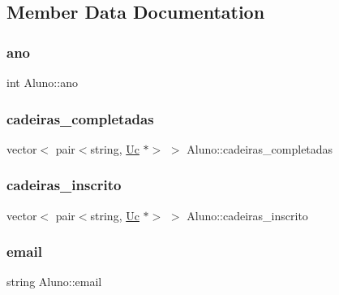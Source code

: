 \subsection{Member Data Documentation}
\hypertarget{class_aluno_abcf2d0bb0b690d81e01e9b38f68897c6}{}\label{class_aluno_abcf2d0bb0b690d81e01e9b38f68897c6} 
\subsubsection{\texorpdfstring{ano}{ano}}
{\footnotesize\ttfamily int Aluno\+::ano\hspace{0.3cm}{\ttfamily [private]}}

\hypertarget{class_aluno_aa9de55282ab2d53a6e903999db67eefc}{}\label{class_aluno_aa9de55282ab2d53a6e903999db67eefc} 
\subsubsection{\texorpdfstring{cadeiras\+\_\+completadas}{cadeiras\_completadas}}
{\footnotesize\ttfamily vector$<$ pair$<$string, \hyperlink{class_uc}{Uc} $\ast$$>$ $>$ Aluno\+::cadeiras\+\_\+completadas\hspace{0.3cm}{\ttfamily [private]}}

\hypertarget{class_aluno_a1999cc002e1c271c4722717ab457b4e4}{}\label{class_aluno_a1999cc002e1c271c4722717ab457b4e4} 
\subsubsection{\texorpdfstring{cadeiras\+\_\+inscrito}{cadeiras\_inscrito}}
{\footnotesize\ttfamily vector$<$ pair$<$string, \hyperlink{class_uc}{Uc} $\ast$$>$ $>$ Aluno\+::cadeiras\+\_\+inscrito\hspace{0.3cm}{\ttfamily [private]}}

\hypertarget{class_aluno_a3f211b7d1b0aac05976bf25912b66c6b}{}\label{class_aluno_a3f211b7d1b0aac05976bf25912b66c6b} 
\subsubsection{\texorpdfstring{email}{email}}
{\footnotesize\ttfamily string Aluno\+::email\hspace{0.3cm}{\ttfamily [private]}}

